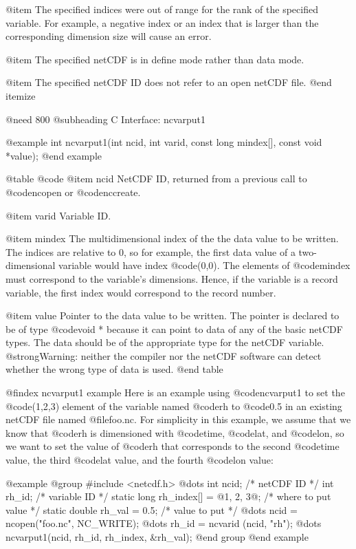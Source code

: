 @item
The specified indices were out of range for the rank of the
specified variable.  For example, a negative index or an index that is
larger than the corresponding dimension size will cause an error.

@item
The specified netCDF is in define mode rather than data mode.

@item
The specified netCDF ID does not refer to an open netCDF file.
@end itemize

@need 800
@subheading C Interface:  ncvarput1

@example
int ncvarput1(int ncid, int varid, const long mindex[], const void *value);
@end example

@table @code
@item ncid
NetCDF ID, returned from a previous call to @code{ncopen} or @code{nccreate}.

@item varid
Variable ID.

@item mindex
The multidimensional index of the the data value to be written.  The
indices are relative to 0, so for example, the first data value of a
two-dimensional variable would have index @code{(0,0)}.  The elements
of @code{mindex} must correspond to the variable's dimensions.  Hence, if
the variable is a record variable, the first index would correspond to
the record number.

@item value
Pointer to the data value to be written.  The pointer is declared to be
of type @code{void *} because it can point to data of any of the basic
netCDF types.  The data should be of the appropriate type for the netCDF
variable.  @strong{Warning: neither the compiler nor the netCDF software
can detect whether the wrong type of data is used.}
@end table

@findex ncvarput1 example
Here is an example using @code{ncvarput1} to set the @code{(1,2,3)}
element of the variable named @code{rh} to @code{0.5} in an existing
netCDF file named @file{foo.nc}.  For simplicity in this example, we
assume that we know that @code{rh} is dimensioned with @code{time},
@code{lat}, and @code{lon}, so we want to set the value of @code{rh} that
corresponds to the second @code{time} value, the third @code{lat} value,
and the fourth @code{lon} value:

@example
@group
#include <netcdf.h>
   @dots{}
int  ncid;                         /* netCDF ID */
int  rh_id;                        /* variable ID */
static long rh_index[] = @{1, 2, 3@}; /* where to put value */
static double rh_val = 0.5;        /* value to put */
   @dots{}
ncid = ncopen("foo.nc", NC_WRITE);
   @dots{}
rh_id = ncvarid (ncid, "rh");
   @dots{}
ncvarput1(ncid, rh_id, rh_index, &rh_val);
@end group
@end example

